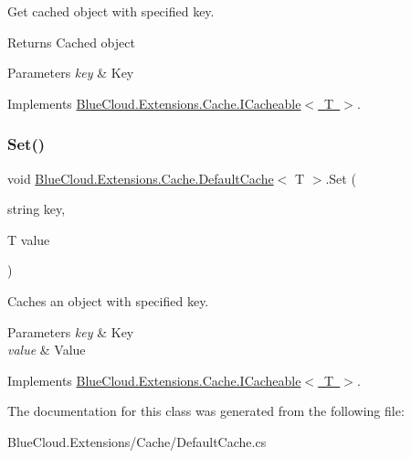 Get cached object with specified key. 

\begin{DoxyReturn}{Returns}
Cached object
\end{DoxyReturn}

\begin{DoxyParams}{Parameters}
{\em key} & Key\\
\hline
\end{DoxyParams}


Implements \mbox{\hyperlink{interface_blue_cloud_1_1_extensions_1_1_cache_1_1_i_cacheable_aadcdce6338f6c4aaafc6c3068c4b6dc1}{Blue\+Cloud.\+Extensions.\+Cache.\+I\+Cacheable$<$ T $>$}}.

\mbox{\label{class_blue_cloud_1_1_extensions_1_1_cache_1_1_default_cache_a516484e43036468f7258451139938798}} 
\subsubsection{\texorpdfstring{Set()}{Set()}}
{\footnotesize\ttfamily void \mbox{\hyperlink{class_blue_cloud_1_1_extensions_1_1_cache_1_1_default_cache}{Blue\+Cloud.\+Extensions.\+Cache.\+Default\+Cache}}$<$ T $>$.Set (\begin{DoxyParamCaption}\item[{string}]{key,  }\item[{T}]{value }\end{DoxyParamCaption})\hspace{0.3cm}{\ttfamily [inline]}}



Caches an object with specified key. 


\begin{DoxyParams}{Parameters}
{\em key} & Key\\
\hline
{\em value} & Value\\
\hline
\end{DoxyParams}


Implements \mbox{\hyperlink{interface_blue_cloud_1_1_extensions_1_1_cache_1_1_i_cacheable_a668a7dff25dcd6a612830c4d15fe73cb}{Blue\+Cloud.\+Extensions.\+Cache.\+I\+Cacheable$<$ T $>$}}.



The documentation for this class was generated from the following file\+:\begin{DoxyCompactItemize}
\item 
Blue\+Cloud.\+Extensions/\+Cache/Default\+Cache.\+cs\end{DoxyCompactItemize}
